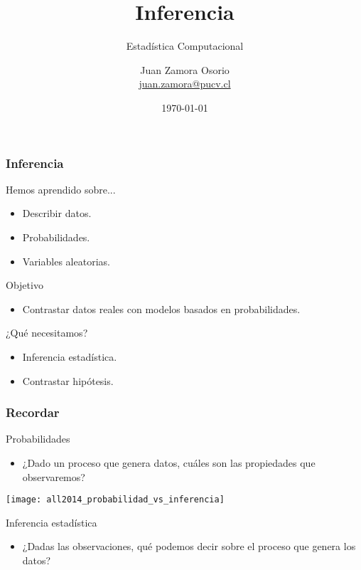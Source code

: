 \documentclass[table]{beamer}
\title{Inferencia}
\subtitle{Estadística Computacional}
\author[J.Z.O-2023]{Juan Zamora Osorio\\\url{juan.zamora@pucv.cl}}
\institute[PUCV]{Instituto de Estadística\\Pontificia Universidad Cat\'olica de Valpara\'iso}
\date{\today}
\begin{document}
\frame{\titlepage}

\begin{frame}
    \frametitle{Inferencia}
    \begin{block}{Hemos aprendido sobre...}
        \begin{itemize}
            \item Describir datos.
            \item Probabilidades.
            \item Variables aleatorias.
        \end{itemize}
    \end{block}
    \begin{block}{Objetivo}
        \begin{itemize}
            \item Contrastar datos reales con modelos basados en probabilidades.
        \end{itemize}
    \end{block}
    \begin{block}{¿Qué necesitamos?}
        \begin{itemize}
            \item Inferencia estadística.
            \item Contrastar hipótesis.
        \end{itemize}
    \end{block}
\end{frame}

\begin{frame}
    \frametitle{Recordar}
    \begin{block}{Probabilidades}
        \begin{itemize}
            \item ¿Dado un proceso que genera datos, cuáles son las propiedades que observaremos?
        \end{itemize}
    \end{block}
    \begin{center}
        \texttt{[image: all2014\_probabilidad\_vs\_inferencia]}
    \end{center}
    \begin{block}{Inferencia estadística}
        \begin{itemize}
            \item ¿Dadas las observaciones, qué podemos decir sobre el proceso que genera los datos?
        \end{itemize}
    \end{block}
\end{frame}
\end{document}
